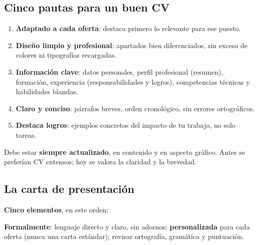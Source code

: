 \subsection*{Cinco pautas para un buen CV}
\begin{enumerate}[leftmargin=1.6em,itemsep=2pt,label={\mono\small\color{inkmuted}\arabic*.}]
\item \textbf{Adaptado a cada oferta}: destaca primero lo relevante para ese puesto.
\item \textbf{Diseño limpio y profesional}: apartados bien diferenciados, sin exceso de colores ni tipografías recargadas.
\item \textbf{Información clave}: datos personales, perfil profesional (resumen), formación, experiencia (responsabilidades y logros), competencias técnicas y habilidades blandas.
\item \textbf{Claro y conciso}: párrafos breves, orden cronológico, sin errores ortográficos.
\item \textbf{Destaca logros}: ejemplos concretos del impacto de tu trabajo, no solo tareas.
\end{enumerate}
Debe estar \textbf{siempre actualizado}, en contenido y en aspecto gráfico. Antes se preferían CV extensos; hoy se valora la claridad y la brevedad.

\subsection{La carta de presentación}
\textbf{Cinco elementos}, en este orden:
\begin{center}
\end{center}
\textbf{Formalmente}: lenguaje directo y claro, sin adornos; \textbf{personalizada} para cada oferta (nunca una carta estándar); revisar ortografía, gramática y puntuación.

